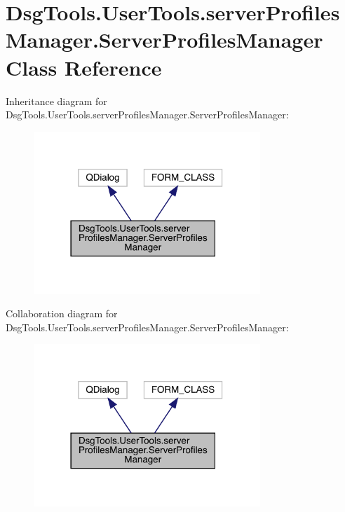 \hypertarget{class_dsg_tools_1_1_user_tools_1_1server_profiles_manager_1_1_server_profiles_manager}{}\section{Dsg\+Tools.\+User\+Tools.\+server\+Profiles\+Manager.\+Server\+Profiles\+Manager Class Reference}
\label{class_dsg_tools_1_1_user_tools_1_1server_profiles_manager_1_1_server_profiles_manager}


Inheritance diagram for Dsg\+Tools.\+User\+Tools.\+server\+Profiles\+Manager.\+Server\+Profiles\+Manager\+:
\nopagebreak
\begin{figure}[H]
\begin{center}
\leavevmode
\includegraphics[width=242pt]{class_dsg_tools_1_1_user_tools_1_1server_profiles_manager_1_1_server_profiles_manager__inherit__graph}
\end{center}
\end{figure}


Collaboration diagram for Dsg\+Tools.\+User\+Tools.\+server\+Profiles\+Manager.\+Server\+Profiles\+Manager\+:
\nopagebreak
\begin{figure}[H]
\begin{center}
\leavevmode
\includegraphics[width=242pt]{class_dsg_tools_1_1_user_tools_1_1server_profiles_manager_1_1_server_profiles_manager__coll__graph}
\end{center}
\end{figure}
